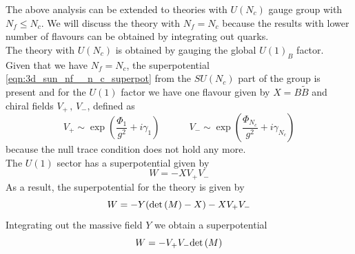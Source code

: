 The above analysis can be extended to theories with $U(N_c)$ gauge group with $N_f \leq N_c$.
We will discuss the theory with $N_f = N_c$ because the results with lower number of flavours can be obtained by integrating out quarks.\\
The theory with $U(N_c)$ is obtained by gauging the global $U(1)_B$ factor.\\
Given that we have $N_f=N_c$, the superpotential \eqref{eqn:3d_sun_nf__n_c_superpot} from the $SU(N_c)$ part of the group is present and for the $U(1)$ factor we have one flavour given by $X = B \tilde{B}$ 
and chiral fields $V_+ \, , \,V_-$, defined as 
\begin{equation}
V_+ \sim \exp{ \left(  \frac{\Phi_1}{g^2} + i \gamma_1 \right) } \qquad \quad V_- \sim \exp{ \left( \frac{\Phi_{N_c}}{g^2} + i \gamma_{N_c} \right) }
\label{eqn:un_moduli_space_coordinates}
\end{equation}
because the null trace condition does not hold any more.\\
 The $U(1)$ sector has a superpotential given by
 $$ W = - X V_+ V_-$$
As a result, the superpotential for the theory is given by
\begin{equation}
 W = - Y ( \mathrm{det } \,{(M)}  - X) - X V_+ V_- 
 \end{equation} 
Integrating out the massive field $Y$  we obtain a superpotential
\begin{equation}
W = -  V_+ V_-  \mathrm{det } \,{(M)}
\label{eqn:aharony_dual_description_NcNf}
\end{equation}


















